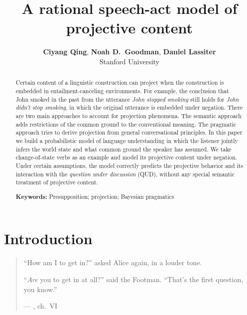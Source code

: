\documentclass[10pt,letterpaper]{article}
\title{A rational speech-act model of projective content}
\author{{\large \bf Ciyang Qing}, {\large \bf Noah D.~Goodman}, {\large \bf Daniel Lassiter}\\
Stanford University}
\begin{document}
\maketitle
 
\begin{abstract}
Certain content of a linguistic construction can project when the construction is embedded in entailment-canceling environments.
 For example, the conclusion that John smoked in the past from the utterance \emph{John stopped smoking} 
 still holds for \emph{John didn't stop smoking}, in which the original utterance is 
 embedded under negation. 
 There are two main approaches to account for projection phenomena. 
 The semantic approach adds restrictions of the common ground to the conventional meaning.
 The pragmatic approach tries to derive projection from general conversational principles. 
 In this paper we build a probabilistic model of language understanding in which the listener 
  jointly infers the world state and what common ground the speaker has assumed. 
 We take change-of-state verbs as an example and model its projective content under negation. 
 Under certain assumptions, the model correctly predicts the projective behavior and its interaction with 
  the \emph{question under discussion} (QUD), without any special semantic treatment of projective content.

\textbf{Keywords:} 
Presupposition; projection; Bayesian pragmatics
\end{abstract}

\section{Introduction}
\label{sec:Intro}

\begin{quotation}
\noindent ``How am I to get in?'' asked Alice again, in a louder tone.

\noindent ``\emph{Are} you to get in at all?'' said the Footman. ``That's the first question, you know.'' 
\begin{flushright}
--- , ch.\ VI
\end{flushright}
\end{quotation}
\end{document}
